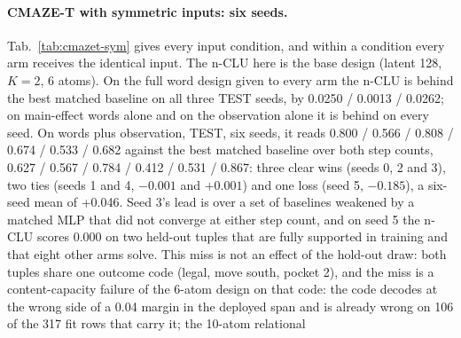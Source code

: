 \documentclass{article} %
\begin{document}
\paragraph{CMAZE-T with symmetric inputs: six seeds.}
Tab.~\ref{tab:cmazet-sym} gives every input condition, and within a condition every arm receives the
identical input. The n-CLU here is the base design (latent 128, $K=2$, 6 atoms). On the full word design given %
to every arm the n-CLU is behind the best matched baseline on all three TEST seeds, by 0.0250 / 0.0013 /
0.0262; on main-effect words alone and on the observation alone it is behind on every seed. On words
plus observation, TEST, six seeds, it reads 0.800 / 0.566 / 0.808 / 0.674 / 0.533 / 0.682 against the
best matched baseline over both step counts, 0.627 / 0.567 / 0.784 / 0.412 / 0.531 / 0.867: three
clear wins (seeds 0, 2 and 3), two ties (seeds 1 and 4, $-0.001$ and $+0.001$) and
one loss (seed 5, $-0.185$), a six-seed mean of +0.046. Seed 3's lead is over a set of baselines weakened
by a matched MLP that did not converge at either step count, and on seed 5 the n-CLU scores 0.000 on two
held-out tuples that are fully supported in training and that eight other arms solve. This miss is
not an effect of the hold-out draw: both tuples share one outcome code (legal, move south, pocket 2),
and the miss is a content-capacity failure of the 6-atom design on that code: the code decodes at the wrong
side of a 0.04 margin in the deployed span and is already wrong on 106 of the 317 fit rows that carry it; %
the 10-atom relational
\end{document}
